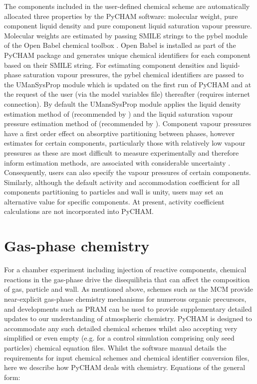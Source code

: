 \documentclass[gmd, manuscript]{copernicus}
\begin{document}
The components included in the user-defined chemical scheme are automatically allocated three properties by the PyCHAM software: molecular weight, pure component liquid density and pure component liquid saturation vapour pressure.  Molecular weights are  estimated by passing SMILE strings to the pybel module of the Open Babel chemical toolbox \citep{OBoyle2011}.  Open Babel is installed as part of the PyCHAM package and generates unique chemical identifiers for each component based on their SMILE string.  For estimating component densities and liquid-phase saturation vapour pressures, the pybel chemical identifiers are passed to the UManSysProp module \citep{Topping2016} which is updated on the first run of PyCHAM and at the request of the user (via the model variables file) thereafter (requires internet connection).  By default the UMansSysProp module applies the liquid density estimation method of \citet{Girolami1994} (recommended by \citet{Barley2013}) and the liquid saturation vapour pressure estimation method of \citet{Nannoolal2008} (recommended by \citet{OMeara2014}).  Component vapour pressures have a first order effect on absorptive partitioning between phases, however estimates for certain components, particularly those with relatively low vapour pressures as these are most difficult to measure experimentally and therefore inform estimation methods,  are associated with considerable uncertainty \citep{OMeara2014}.  Consequently, users can also specify the vapour pressures of certain components.  Similarly, although the default activity and accommodation coefficient for all components partitioning to particles and wall is unity, users may set an alternative value for specific components.  At present, activity coefficient calculations are not incorporated into PyCHAM.

\section{Gas-phase chemistry}\label{sec:photochem}

For a chamber experiment including injection of reactive components, chemical reactions in the gas-phase drive the disequilibria that can affect the composition of gas, particle and wall.  As mentioned above, schemes such as the MCM provide near-explicit gas-phase chemistry mechanisms for numerous organic precursors, and developments such as PRAM \citep{Roldin2019} can be used to provide supplementary detailed updates to our understanding of atmospheric chemistry.  PyCHAM is designed to accommodate any such detailed chemical schemes whilst also accepting very simplified or even empty (e.g. for a control simulation comprising only seed particles) chemical equation files.  Whilst the software manual details the requirements for input chemical schemes and chemical identifier conversion files, here we describe how PyCHAM deals with chemistry.  Equations of the general form:
\end{document}
